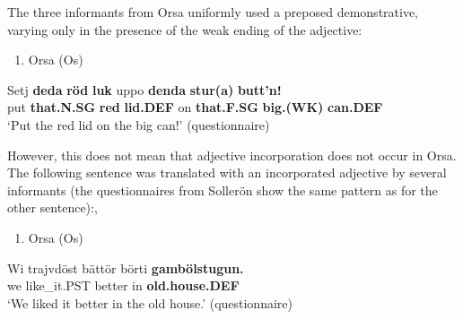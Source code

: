 The three informants from Orsa uniformly used a preposed demonstrative, varying only in the presence of the weak ending of the adjective: 

\begin{enumerate} %
\item 
Orsa (Os)

\end{enumerate} %
\ea\label{}
\gll Setj  \textbf{deda} \textbf{röd} \textbf{luk} uppo  \textbf{denda} \textbf{stur(a)} \textbf{butt’n!}\\


put  \textbf{that.N.SG} \textbf{red} \textbf{lid.DEF} on  \textbf{that.F.SG} \textbf{big.(WK)} \textbf{can.DEF}\\ %


‘Put the red lid on the big can!’ (questionnaire)
\z


However, this does not mean that adjective incorporation does not occur in Orsa. The following sentence was translated with an incorporated adjective by several informants (the questionnaires from Sollerön show the same pattern as for the other sentence):,

\begin{enumerate} %
\item 
Orsa (Os)

\end{enumerate} %
\ea\label{}
\gll Wi  trajvdöst  bättör  börti  \textbf{gambölstugun.}\\


we  like\_it.PST  better  in  \textbf{old.house.DEF}\\ %


‘We liked it better in the old house.’ (questionnaire)
\z


